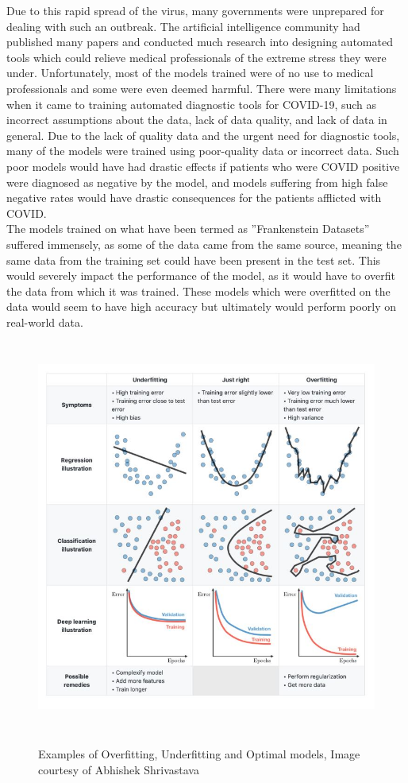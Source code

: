 Due to this rapid spread of the virus, many governments were unprepared for dealing with such an outbreak.  The artificial intelligence community had published many papers and conducted much research into designing automated tools which could relieve medical professionals of the extreme stress they were under. Unfortunately, most of the models trained were of no use to medical professionals and some were even deemed harmful\cite{mitTechReviewCovid19}.    There were many limitations when it came to training automated diagnostic tools for COVID-19, such as incorrect assumptions about the data, lack of data quality, and lack of data in general.  Due to the lack of quality data and the urgent need for diagnostic tools, many of the models were trained using poor-quality data or incorrect data.  Such poor models would have had drastic effects if patients who were COVID positive were diagnosed as negative by the model, and models suffering from high false negative rates would have drastic consequences for the patients afflicted with COVID.
\\
The models trained on what have been termed as ''Frankenstein Datasets'' suffered immensely, as some of the data came from the same source, meaning the same data from the training set could have been present in the test set. This would severely impact the performance of the model, as it would have to overfit the data from which it was trained.  These models which were overfitted on the data would seem to have high accuracy but ultimately would perform poorly on real-world data.
 \begin{figure}[H]
    \centering
    \includegraphics[width=1\textwidth,height=13cm,keepaspectratio]{Images/OverfittingUnderfitting.png}\\
    \caption{Examples of Overfitting, Underfitting and Optimal models, Image courtesy of Abhishek Shrivastava\cite{overfittingKaggle}}
    \label{fig:Examples of Overfitting, Underfitting and optimal models}
\end{figure}

